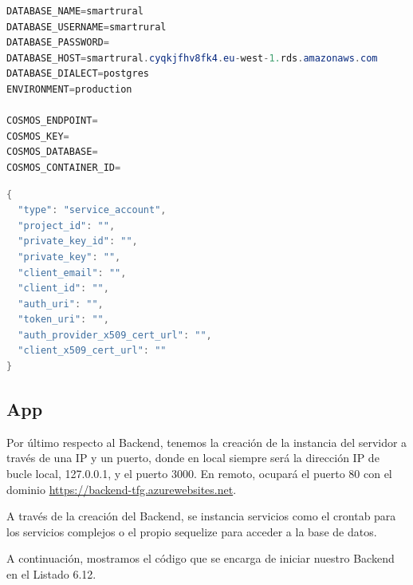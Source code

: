 \begin{lstlisting}[language=Java,caption={Fichero .env.production},captionpos=b]
DATABASE_NAME=smartrural
DATABASE_USERNAME=smartrural
DATABASE_PASSWORD=
DATABASE_HOST=smartrural.cyqkjfhv8fk4.eu-west-1.rds.amazonaws.com
DATABASE_DIALECT=postgres
ENVIRONMENT=production

COSMOS_ENDPOINT=
COSMOS_KEY=
COSMOS_DATABASE=
COSMOS_CONTAINER_ID=
\end{lstlisting}

\begin{lstlisting}[language=Java,caption={Fichero firebaseServiceAccount.json},captionpos=b]
{
  "type": "service_account",
  "project_id": "",
  "private_key_id": "",
  "private_key": "",
  "client_email": "",
  "client_id": "",
  "auth_uri": "",
  "token_uri": "",
  "auth_provider_x509_cert_url": "",
  "client_x509_cert_url": ""
}
\end{lstlisting}

\subsection{App}
Por último respecto al Backend, tenemos la creación de la instancia del servidor a través de una IP y un puerto, donde en local siempre será la dirección IP de bucle local, 127.0.0.1, y el puerto 3000. En remoto, ocupará el puerto 80 con el dominio \textcolor{blue}{\href{https://backend-tfg.azurewebsites.net}{https://backend-tfg.azurewebsites.net}}.

A través de la creación del Backend, se instancia servicios como el crontab para los servicios complejos o el propio sequelize para acceder a la base de datos.

A continuación, mostramos el código que se encarga de iniciar nuestro Backend en el Listado 6.12.

